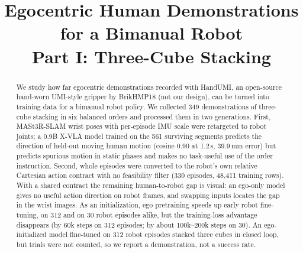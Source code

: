 \documentclass[conference,10pt]{IEEEtran}
\newcommand{\mm}{\,mm\xspace}
\begin{document}
\title{Egocentric Human Demonstrations for a Bimanual Robot\\Part I: Three-Cube Stacking}
\author{
}
\maketitle

\begin{abstract}
We study how far egocentric demonstrations recorded with HandUMI, an open-source hand-worn UMI-style gripper by BrikHMP18 (not our design), can be turned into training data for a
bimanual robot policy. We collected 349 demonstrations of three-cube stacking in six balanced orders and processed them in two
generations. First, MASt3R-SLAM wrist poses with per-episode IMU scale were retargeted to robot joints; a 0.9B X-VLA model trained
on the 561 surviving segments predicts the direction of held-out moving human motion (cosine 0.90 at 1.2\,s, 39.9\mm error) but
predicts spurious motion in static phases and makes no task-useful use of the order instruction. Second, whole episodes were
converted to the robot's own relative Cartesian action contract with no feasibility filter (330 episodes, 48{,}411 training
rows). With a shared contract the remaining human-to-robot gap is visual: an ego-only model gives no useful action direction on
robot frames, and swapping inputs locates the gap in the wrist images. As an initialization, ego pretraining speeds up early robot
fine-tuning, on 312 and on 30 robot episodes alike, but the training-loss advantage disappears (by 60k steps on 312 episodes; by
about 100k--200k steps on 30). An ego-initialized model fine-tuned on 312 robot episodes stacked three cubes in closed loop, but
trials were not counted, so we report a demonstration, not a success rate.
\end{abstract}
\end{document}
